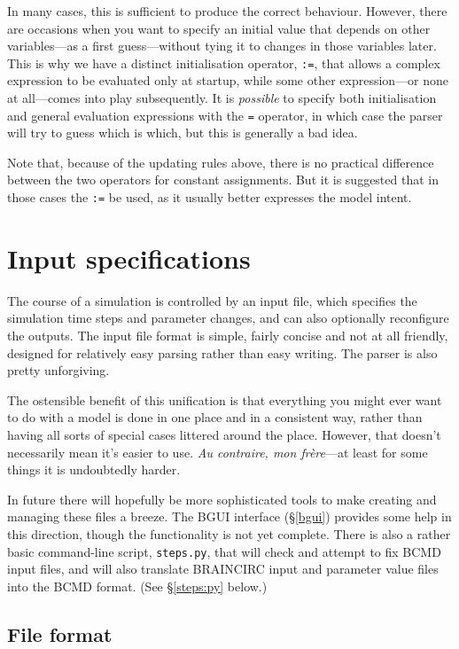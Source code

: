 \documentclass[a4paper,11pt]{article}
\begin{document}
In many cases, this is sufficient to produce the correct behaviour. However, there are occasions when you want to specify an initial value that depends on other variables---as a first guess---without tying it to changes in those variables later. This is why we have a distinct initialisation operator, \texttt{:=}, that allows a complex expression to be evaluated only at startup, while some other expression---or none at all---comes into play subsequently. It is \textit{possible} to specify both initialisation and general evaluation expressions with the \texttt{=} operator, in which case the parser will try to guess which is which, but this is generally a bad idea.

Note that, because of the updating rules above, there is no practical difference between the two operators for constant assignments. But it is suggested that in those cases the \texttt{:=} be used, as it usually better expresses the model intent.


\section{Input specifications}\label{input}

The course of a simulation is controlled by an input file, which specifies the simulation time steps and parameter changes, and can also optionally reconfigure the outputs. The input file format is simple, fairly concise and not at all friendly, designed for relatively easy parsing rather than easy writing. The parser is also pretty unforgiving.

The ostensible benefit of this unification is that everything you might ever want to do with a model is done in one place and in a consistent way, rather than having all sorts of special cases littered around the place. However, that doesn't necessarily mean it's easier to use. \textit{Au contraire, mon fr\`ere}---at least for some things it is undoubtedly harder.

In future there will hopefully be more sophisticated tools to make creating and managing these files a breeze. The BGUI interface (\S\ref{bgui}) provides some help in this direction, though the functionality is not yet complete. There is also a rather basic command-line script, \texttt{steps.py}, that will check and attempt to fix BCMD input files, and will also translate BRAINCIRC input and parameter value files into the BCMD format. (See \S\ref{steps:py} below.)

\subsection{File format}
\end{document}
